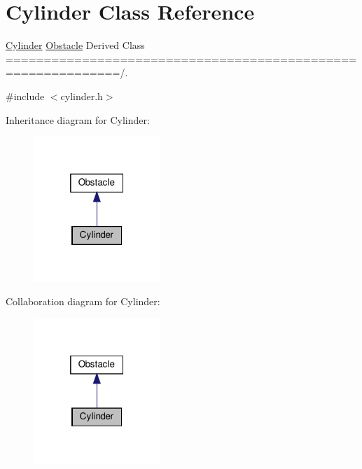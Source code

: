 \hypertarget{class_cylinder}{}\section{Cylinder Class Reference}
\label{class_cylinder}


\hyperlink{class_cylinder}{Cylinder} \hyperlink{class_obstacle}{Obstacle} Derived Class =============================================================/.  




{\ttfamily \#include $<$cylinder.\+h$>$}



Inheritance diagram for Cylinder\+:\nopagebreak
\begin{figure}[H]
\begin{center}
\leavevmode
\includegraphics[width=136pt]{class_cylinder__inherit__graph}
\end{center}
\end{figure}


Collaboration diagram for Cylinder\+:\nopagebreak
\begin{figure}[H]
\begin{center}
\leavevmode
\includegraphics[width=136pt]{class_cylinder__coll__graph}
\end{center}
\end{figure}
